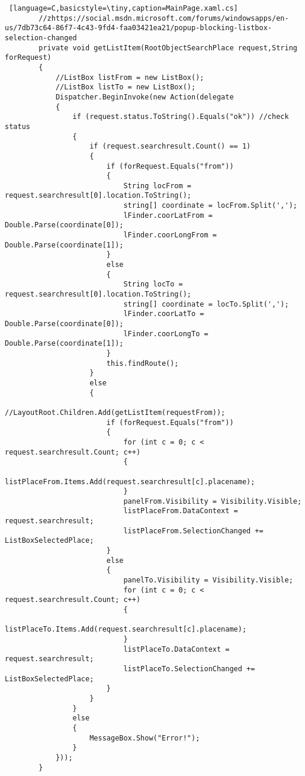 \begin{lstlisting} [language=C,basicstyle=\tiny,caption=MainPage.xaml.cs]
        //zhttps://social.msdn.microsoft.com/forums/windowsapps/en-us/7db73c64-86f7-4c43-9fd4-faa03421ea21/popup-blocking-listbox-selection-changed
        private void getListItem(RootObjectSearchPlace request,String forRequest)
        {
            //ListBox listFrom = new ListBox();
            //ListBox listTo = new ListBox();
            Dispatcher.BeginInvoke(new Action(delegate
            {
                if (request.status.ToString().Equals("ok")) //check status
                {
                    if (request.searchresult.Count() == 1)
                    {
                        if (forRequest.Equals("from"))
                        {
                            String locFrom = request.searchresult[0].location.ToString();
                            string[] coordinate = locFrom.Split(',');
                            lFinder.coorLatFrom = Double.Parse(coordinate[0]);
                            lFinder.coorLongFrom = Double.Parse(coordinate[1]);
                        }
                        else
                        {
                            String locTo = request.searchresult[0].location.ToString();
                            string[] coordinate = locTo.Split(',');
                            lFinder.coorLatTo = Double.Parse(coordinate[0]);
                            lFinder.coorLongTo = Double.Parse(coordinate[1]);
                        }
                        this.findRoute();
                    }
                    else
                    {
                        //LayoutRoot.Children.Add(getListItem(requestFrom));
                        if (forRequest.Equals("from"))
                        {
                            for (int c = 0; c < request.searchresult.Count; c++)
                            {
                                listPlaceFrom.Items.Add(request.searchresult[c].placename);
                            }
                            panelFrom.Visibility = Visibility.Visible;
                            listPlaceFrom.DataContext = request.searchresult;
                            listPlaceFrom.SelectionChanged += ListBoxSelectedPlace;
                        }
                        else
                        {
                            panelTo.Visibility = Visibility.Visible;
                            for (int c = 0; c < request.searchresult.Count; c++)
                            {
                                listPlaceTo.Items.Add(request.searchresult[c].placename);
                            }
                            listPlaceTo.DataContext = request.searchresult;
                            listPlaceTo.SelectionChanged += ListBoxSelectedPlace;
                        }
                    }
                }
                else
                {
                    MessageBox.Show("Error!");
                }
            }));
        }


\end{lstlisting}
